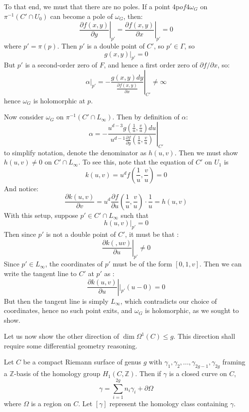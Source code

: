 \documentclass{book}
\newcommand{\Z}{{\mathbb{Z}}}
\begin{document}
\begin{Proof}
  To that end, we must that there are no poles. If a point 4p$ of 4\omega_G$ on $\pi^{-1}(C'\cap U_0)$ can
    become a pole of $\omega_G$, then:
    \[
      \left. \frac{\partial f(x,y)}{\partial y}\right|_{p'} = \left.\frac{\partial f(x,y)}{\partial x}\right|_{p'}
        = 0
    \]
    where $p' = \pi(p)$. Then $p'$ is a double point of $C'$, so $p' \in \Gamma$, so
    \[
      g(x,y)|_{p'} = 0
    \]
    But $p'$ is a second-order zero of $F$, and hence a first order zero of $\partial f/\partial x$, so:
    \[
      \alpha|_{p'} = \left.-\frac{g(x,y)dy}{\frac{\partial f(x,y)}{\partial x}}\right|_{C'} \ne \infty
    \]
    hence $\omega_G$ is holomorphic at $p$.

    Now consider $\omega_G$ on $\pi^{-1}(C'\cap L_\infty)$. Then by definition of $\alpha$:
    \[
      \alpha = - \left.\frac{u^{d-3}g \left(\frac{1}{u}, \frac{v}{u}\right)du}{u^{d-1} \frac{\partial f}{\partial y}
      \left(\frac{1}{u}, \frac{v}{u}\right)}\right|_{C'}
    \]
    to simplify notation, denote the denominator as $h(u,v)$. Then we must show $h(u,v) \ne 0$ on $C'\cap
    L_\infty$. To see this, note that the equation of $C'$ on $U_1$ is
    \[
      k(u,v) = u^d f \left(\frac{1}{u}, \frac{v}{u}\right) = 0
    \]
    And notice:
    \[
      \frac{\partial k(u,v)}{\partial v} = u^d \frac{\partial f}{\partial u} \left( \frac{1}{u},
      \frac{v}{u}\right) \cdot \frac{1}{u} = h(u,v)
    \]
    With this setup, suppose $p' \in C' \cap L_\infty$ such that
    \[
      h(u,v)|_{p'} = 0
    \]
    Then since $p'$ is not a double point of $C'$, it must be that :
    \[
      \left.\frac{\partial k(,uv)}{\partial u}\right|_{p'} \ne 0
    \]
    Since $p' \in L_\infty$, the coordinates of $p'$ must be of the form $[0,1,v]$. Then we can write the
    tangent line to $C'$ at $p'$ as :
    \[
      \left.\frac{\partial k(u,v)}{\partial u}\right||_{p'}(u-0) = 0
    \]
    But then the tangent line is simply $L_\infty$, which contradicts our choice of coordinates, hence no such
    point exits, and $\omega_G$ is holomorphic, as we sought to show.
\end{Proof}

Let us now show the other direction of $\dim \Omega^1(C) \le g$. This direction shall require some
differential geometry reasoning.

Let $C$ be a compact Riemann surface of genus $g$ with $\gamma_1, \gamma_2, ..., \gamma_{2g-1}, \gamma_{2g}$
framing a $\Z$-basis of the homology group $H_1(C, \Z)$. Then if $\gamma$ is a closed curve on $C$,
\[
  \gamma = \sum_{i=1}^{2g} n_i\gamma_i + \partial \Omega
\]
where $\Omega$ is a region on $C$. Let $[\gamma]$ represent the homology class containing $\gamma$.
\end{document}

